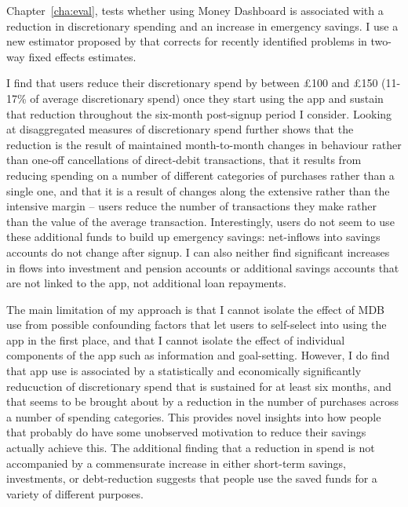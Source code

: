 Chapter~\ref{cha:eval}, tests whether using Money Dashboard is associated with
a reduction in discretionary spending and an increase in emergency savings. I
use a new estimator proposed by \citet{callaway2021difference} that corrects
for recently identified problems in two-way fixed effects estimates.

I find that users reduce their discretionary spend by between \pounds100 and
\pounds150 (11-17\% of average discretionary spend) once they start using the
app and sustain that reduction throughout the six-month post-signup period I
consider. Looking at disaggregated measures of discretionary spend further
shows that the reduction is the result of maintained month-to-month changes in
behaviour rather than one-off cancellations of direct-debit transactions, that
it results from reducing spending on a number of different categories of
purchases rather than a single one, and that it is a result of changes along
the extensive rather than the intensive margin -- users reduce the number of
transactions they make rather than the value of the average transaction.
Interestingly, users do not seem to use these additional funds to build up
emergency savings: net-inflows into savings accounts do not change after
signup. I can also neither find significant increases in flows into investment
and pension accounts or additional savings accounts that are not linked to the
app, not additional loan repayments.

The main limitation of my approach is that I cannot isolate the effect of MDB
use from possible confounding factors that let users to self-select into using
the app in the first place, and that I cannot isolate the effect of individual
components of the app such as information and goal-setting. However, I do find
that app use is associated by a statistically and economically significantly
reducuction of discretionary spend that is sustained for at least six months,
and that seems to be brought about by a reduction in the number of purchases
across a number of spending categories. This provides novel insights into how
people that probably do have some unobserved motivation to reduce their savings
actually achieve this. The additional finding that a reduction in spend is not
accompanied by a commensurate increase in either short-term savings,
investments, or debt-reduction suggests that people use the saved funds for a
variety of different purposes.

